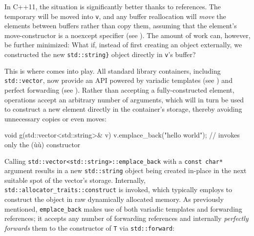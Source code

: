 In C++11, the situation is significantly better thanks to
 references. The temporary will be moved into
\lstinline!v!, and any buffer reallocation will \emph{move} the elements
between buffers rather than copy them, assuming that the element's
move-constructor is a noexcept specifier (see ). 
The amount of work
can, however, be further minimized: What if, instead of first creating
an object externally, we constructed the new \lstinline!std::string}! object
directly in \lstinline!v!'s buffer?

This is where  comes into play. All standard library
containers, including \lstinline!std::vector!, now provide an
 API powered by variadic templates (see ) 
and perfect forwarding (see ). 
Rather than accepting a
fully-constructed element,  operations accept an
arbitrary number of arguments, which will in turn be used to construct a
new element directly in the container's storage, thereby avoiding
unnecessary copies or even moves:

\begin{emcppslisting}[emcppsbatch=e11]
void g(std::vector<std::string>& v)
{
    v.emplace_back("hello world");
        // invokes only the (ù{}ù) constructor
}
\end{emcppslisting}

\noindent Calling \lstinline!std::vector<std::string>::emplace_back! with a
\lstinline!const!~\lstinline!char*! argument results in a new
\lstinline!std::string! object being created in-place in the next suitable
spot of the vector's storage. Internally,
\lstinline!std::allocator_traits::construct! is invoked, which typically
employs  to construct the object in raw
dynamically allocated memory. As previously mentioned,
\lstinline!emplace_back! makes use of both variadic
templates and forwarding references; it accepts any
number of forwarding references and internally \textit{perfectly forwards} them
to the constructor of \lstinline!T! via \lstinline!std::forward!:

